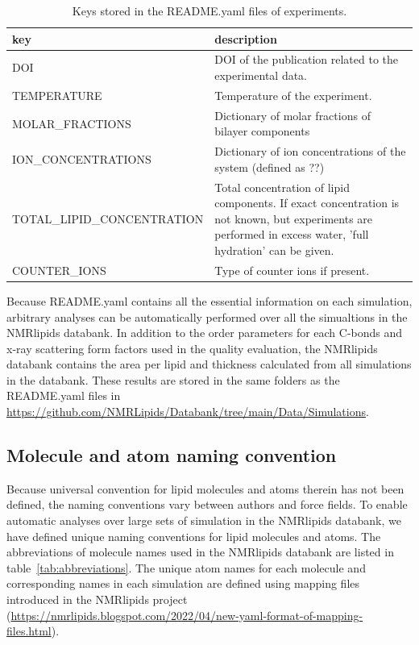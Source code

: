 \documentclass[fleqn,10pt]{wlscirep}
\begin{document}
\begin{table}[]
    \centering
    \begin{tabular}{  p{5.0cm}  p{10.0cm}}
    \toprule
    key & description \\
    \midrule
    DOI & DOI of the publication related to the experimental data. \\
    TEMPERATURE & Temperature of the experiment. \\
    MOLAR\_FRACTIONS & Dictionary of molar fractions of bilayer components \\
    ION\_CONCENTRATIONS & Dictionary of ion concentrations of the system (defined as ??) \\
    TOTAL\_LIPID\_CONCENTRATION & Total concentration of lipid components. If exact concentration is not known, but experiments are performed in excess water, 'full hydration' can be given. \\
    COUNTER\_IONS & Type of counter ions if present.
\end{tabular}
    \caption{Keys stored in the README.yaml files of experiments.}
    \label{tab:READMEkeysEXP}
\end{table}

Because README.yaml contains all the essential information on each simulation, arbitrary analyses can be automatically performed over all the simualtions in the NMRlipids databank. In addition to the order parameters for each C-bonds and x-ray scattering form factors used in the quality evaluation, the NMRlipids databank contains the area per lipid and thickness calculated from all simulations in the databank. These results are stored in the same folders as the README.yaml files in \url{https://github.com/NMRLipids/Databank/tree/main/Data/Simulations}.

\subsection{Molecule and atom naming convention}

Because universal convention for lipid molecules and atoms therein has not been defined, the naming conventions vary between authors and force fields. To enable automatic analyses over large sets of simulation in the NMRlipids databank, we have defined unique naming conventions for lipid molecules and atoms. The abbreviations of molecule names used in the NMRlipids databank are listed in table~\ref{tab:abbreviations}. The unique atom names for each molecule and corresponding names in each simulation are defined using mapping files introduced in the NMRlipids project (\url{https://nmrlipids.blogspot.com/2022/04/new-yaml-format-of-mapping-files.html}). 
\end{document}
